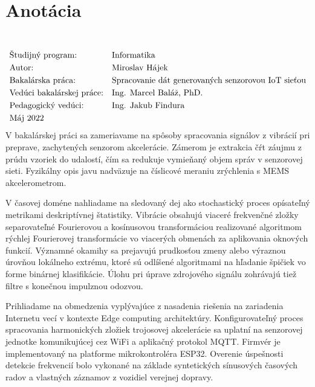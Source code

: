 \thispagestyle{empty}
\section*{Anotácia}
\University \\
\uppercase{\Faculty}
\vspace{-8pt}
{\setlength{\mathindent}{0cm}
\begin{align*}
&\text{Študijný program:} && \text{\StudyProgramme} \\
&\text{Autor:} && \text{\Author} \\
&\text{\Thesis:} && \text{\Title} \\
&\text{Vedúci bakalárskej práce:} && \text{\Supervisor} \\
&\text{Pedagogický vedúci:} && \text{\PedagogicalSupervisor} \\
&\text{\Date}
\end{align*}}
V bakalárskej práci sa zameriavame na spôsoby spracovania signálov z vibrácií pri preprave, zachytených
senzorom akcelerácie. Zámerom je extrakcia čŕt záujmu z prúdu vzoriek do udalostí, čím sa redukuje vymieňaný
objem správ v senzorovej sieti. Fyzikálny opis javu nadväzuje na číslicové meraniu zrýchlenia s
MEMS akcelerometrom.

V časovej doméne nahliadame na sledovaný dej ako stochastický proces opísateľný metrikami deskriptívnej štatistiky.
Vibrácie obsahujú viaceré frekvenčné zložky separovateľné Fourierovou a kosínusovou transformáciou 
realizované algoritmom rýchlej Fourierovej transformácie vo viacerých obmenách za aplikovania oknových funkcií. 
Významné okamihy sa prejavujú prudkosťou zmeny alebo výraznou úrovňou lokálneho extrému, ktoré sú odlíšené algoritmami na
hľadanie špičiek vo forme binárnej klasifikácie. Úlohu pri úprave zdrojového signálu zohrávajú tiež filtre 
s konečnou impulznou odozvou. 

Prihliadame na obmedzenia vyplývajúce z nasadenia riešenia na zariadenia
Internetu vecí v kontexte Edge computing architektúry. Konfigurovateľný proces spracovania harmonických zložiek 
trojosovej akcelerácie sa uplatní na senzorovej jednotke komunikujúcej cez WiFi a aplikačný protokol MQTT. 
Firmvér je implementovaný na platforme mikrokontroléra ESP32. Overenie úspešnosti detekcie frekvencií bolo vykonané
na základe syntetických sínusových časových radov a vlastných záznamov z vozidiel verejnej dopravy.
\emptypage

\thispagestyle{empty}

